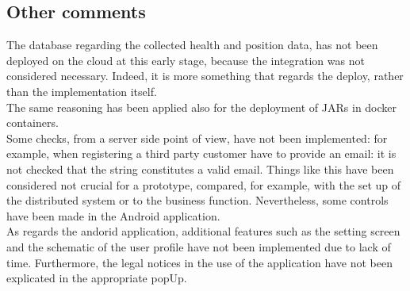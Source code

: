 \subsection{Other comments}
The database regarding the collected health and position data, has not been deployed on the cloud at this
early stage, because the integration was not considered necessary. Indeed, it is more something that regards the deploy, rather than the 
implementation itself. \\
The same reasoning has been applied also for the deployment of JARs in docker containers. \\
Some checks, from a server side point of view, have not been implemented: for example, when registering a third party customer have to
provide an email: it is not checked that the string constitutes a valid email. Things like this have been considered not crucial 
for a prototype, compared, for example, with the set up of the distributed system or to the business function.
Nevertheless, some controls have been made in the Android application. \\ As regards the andorid application, additional features such as the setting screen and the schematic of the user profile have not been implemented due to lack of time. Furthermore, the legal notices in the use of the application have not been explicated in the appropriate popUp.